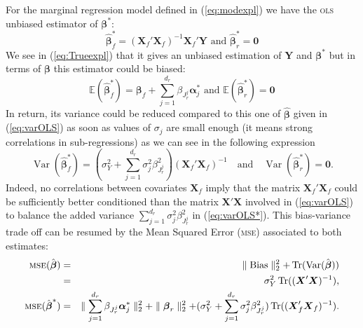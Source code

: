 \documentclass[12pt,a4paper]{report}
\begin{document}
For the marginal regression model defined in (\ref{eq:modexpl})
we have the \textsc{ols} unbiased estimator of $\boldsymbol{\beta}^*$: 
		\begin{equation}
			\hat{\boldsymbol{\beta}}_{f}^* = (\boldsymbol{X}_{f}'\boldsymbol{X}_{f})^{-1}\boldsymbol{X}_{f}'\boldsymbol{Y}  \textrm{ and }\boldsymbol{\hat\beta}_{r}^* = \boldsymbol{0}
		\end{equation}
		We see in (\ref{eq:Trueexpl}) that it gives an unbiased estimation of $\boldsymbol{Y}$ and $\boldsymbol{\beta^*}$
		but in terms of $\boldsymbol{\beta}$ this estimator could be biased:
		\begin{equation}
			\mathbb{E}(\hat{\boldsymbol{\beta}}_{f}^*)=\boldsymbol{\beta}_{f}+\sum_{j =1}^{d_r}\beta_{J_r^j}\boldsymbol{\alpha}_j^* \textrm{ and }\mathbb{E}(\hat{\boldsymbol{\beta}}_{r}^*)=\boldsymbol{0}
		\end{equation}
		In return, its variance could be reduced compared to this one of $\hat{\boldsymbol{\beta}}$ given in (\ref{eq:varOLS}) as soon as values of $\sigma_j$ are small enough (it means strong correlations in sub-regressions) as we can see in the following expression
		\begin{equation}
			\operatorname{Var}(\hat{\boldsymbol{\beta}}_f^*)= (\sigma^2_Y+\sum_{j =1}^{d_r}\sigma^2_{j}\beta_{J_r^j}^2)(\boldsymbol{X}_f' \boldsymbol{X}_f)^{-1} \quad \textrm{and} \quad\operatorname{Var}(\hat{\boldsymbol{\beta}}_r^*)= \boldsymbol{0}. \label{eq:varOLS*}
		\end{equation}
Indeed, no correlations between covariates $\boldsymbol{X}_f$ imply that the matrix $\boldsymbol{X}_f' \boldsymbol{X}_f$ could be sufficiently better conditioned than the matrix $\boldsymbol{X}' \boldsymbol{X}$ involved in (\ref{eq:varOLS}) to balance the added variance $\sum_{j =1}^{d_r}\sigma^2_{j}\beta_{J_r^j}^2$ in (\ref{eq:varOLS*}). This bias-variance trade off can be resumed by the Mean Squared Error (\textsc{mse}) associated to both estimates:
	\begin{eqnarray}
	\textsc{mse}(\hat{\boldsymbol{\beta}})&=&\parallel \operatorname{Bias}\parallel_2^2+\operatorname{Tr}(\operatorname{Var}(\hat{\boldsymbol{\beta}})) \\
			&=& \sigma_Y^2 \operatorname{Tr}((\boldsymbol{X}'\boldsymbol{X})^{-1}),
			 \\
			\textsc{mse}(\hat{\boldsymbol{\beta}}^*)&=& \parallel\sum_{j =1}^{d_r}\beta_{J_r^j}\boldsymbol{\alpha}_j^* \parallel_2^2 +\parallel \boldsymbol{\beta}_r\parallel^2_2 + (\sigma^2_Y+\sum_{j =1}^{d_r}\sigma^2_{j}\beta_{J_r^j}^2 ) \operatorname{Tr}((\boldsymbol{X}_f' \boldsymbol{X}_f)^{-1}).
	\end{eqnarray}	 
\end{document}
